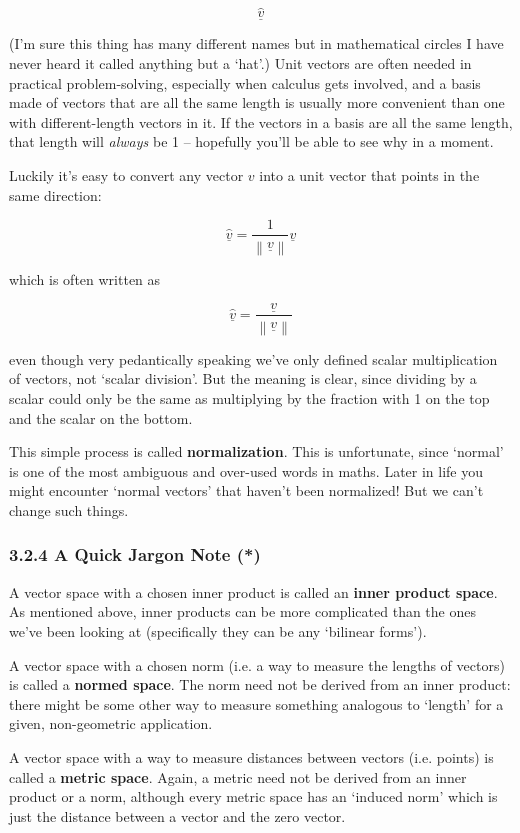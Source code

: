 \documentclass[oneside,english]{amsbook}
\numberwithin{section}{chapter}
\theoremstyle{plain}
\theoremstyle{definition}
\begin{document}
\[\underline{\widehat{v}}\]

(I'm sure this thing has many different names but in mathematical
circles I have never heard it called anything but a `hat'.) Unit
vectors are often needed in practical problem-solving, especially when
calculus gets involved, and a basis made of vectors that are all the
same length is usually more convenient than one with different-length
vectors in it. If the vectors in a basis are all the same length, that
length will \emph{always} be 1 -- hopefully you'll be able to see why in
a moment.

Luckily it's easy to convert any vector $v$ into a unit vector that
points in the same direction:

\[\underline{\widehat{v}} = \frac{1}{\left\| \underline{v} \right\|}\underline{v}\]

which is often written as

\[\underline{\widehat{v}} = \frac{\underline{v}}{\left\| \underline{v} \right\|}\]

even though very pedantically speaking we've only defined scalar
multiplication of vectors, not `scalar division'. But the meaning is
clear, since dividing by a scalar could only be the same as multiplying
by the fraction with 1 on the top and the scalar on the bottom.

This simple process is called \textbf{normalization}. This is
unfortunate, since `normal' is one of the most ambiguous and over-used
words in maths. Later in life you might encounter `normal vectors'
that haven't been normalized! But we can't change such things.

\subsubsection{3.2.4 A Quick Jargon Note (*)}\label{a-quick-jargon-note}

A vector space with a chosen inner product is called an \textbf{inner
	product space}. As mentioned above, inner products can be more
complicated than the ones we've been looking at (specifically they can
be any `bilinear forms').

A vector space with a chosen norm (i.e. a way to measure the lengths of
vectors) is called a \textbf{normed space}. The norm need not be derived
from an inner product: there might be some other way to measure
something analogous to `length' for a given, non-geometric
application.

A vector space with a way to measure distances between vectors (i.e.
points) is called a \textbf{metric space}. Again, a metric need not be
derived from an inner product or a norm, although every metric space has
an `induced norm' which is just the distance between a vector and the
zero vector.
\end{document}
